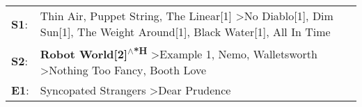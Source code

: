 \begin{supertabular}{p{0.03\textwidth}p{0.92\textwidth}}
 \textbf{S1}:  &  Thin Air\textsuperscript{}, \enspace Puppet String\textsuperscript{}, \enspace The Linear[1]\textsuperscript{} \textgreater \enspace No Diablo[1]\textsuperscript{}, \enspace Dim Sun[1]\textsuperscript{}, \enspace The Weight Around[1]\textsuperscript{}, \enspace Black Water[1]\textsuperscript{}, \enspace All In Time\textsuperscript{}  \enspace  \\
 \textbf{S2}:  &                                                                \textbf{Robot World[2]\textsuperscript{$\wedge$*H}} \textgreater \enspace Example 1\textsuperscript{}, \enspace Nemo\textsuperscript{}, \enspace Walletsworth\textsuperscript{} \textgreater \enspace Nothing Too Fancy\textsuperscript{}, \enspace Booth Love\textsuperscript{}  \enspace  \\
 \textbf{E1}:  &                                                                                                                                                                                                                                                    Syncopated Strangers\textsuperscript{} \textgreater \enspace Dear Prudence\textsuperscript{}  \enspace  \\
\end{supertabular}
